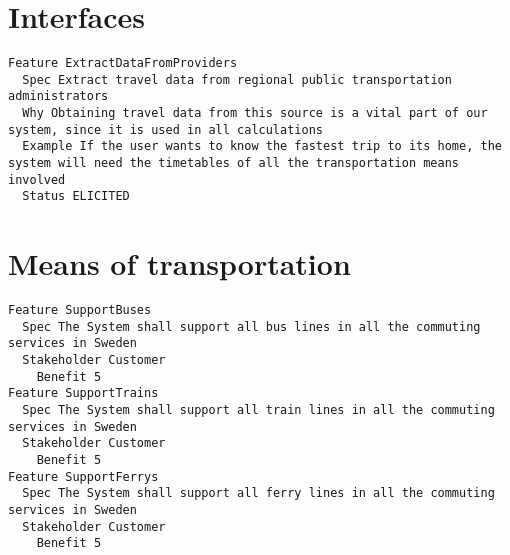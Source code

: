        
       \section{Interfaces}


\begin{lstlisting}
Feature ExtractDataFromProviders
  Spec Extract travel data from regional public transportation administrators
  Why Obtaining travel data from this source is a vital part of our system, since it is used in all calculations
  Example If the user wants to know the fastest trip to its home, the system will need the timetables of all the transportation means involved
  Status ELICITED

\end{lstlisting}
    
        
       \section{Means of transportation}


\begin{lstlisting}
Feature SupportBuses
  Spec The System shall support all bus lines in all the commuting services in Sweden
  Stakeholder Customer
    Benefit 5
Feature SupportTrains
  Spec The System shall support all train lines in all the commuting services in Sweden
  Stakeholder Customer
    Benefit 5
Feature SupportFerrys
  Spec The System shall support all ferry lines in all the commuting services in Sweden
  Stakeholder Customer
    Benefit 5

\end{lstlisting}